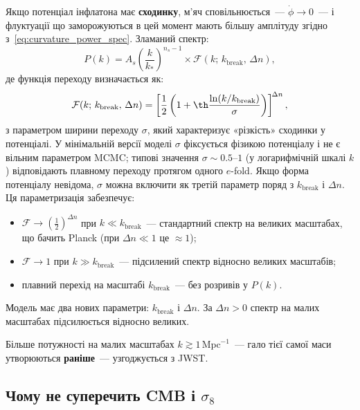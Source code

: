\documentclass[12pt, a4paper]{article}
\begin{document}
Якщо потенціал інфлатона має \textbf{сходинку}, м'яч сповільнюється~---
$\dot{\phi} \to 0$~--- і флуктуації що заморожуються в цей момент
мають більшу амплітуду згідно з~\eqref{eq:curvature_power_spec}.
Зламаний спектр:
\begin{equation}\label{eq:broken_spectrum}
  P(k) = A_s \left(\frac{k}{k_*}\right)^{n_s-1}
  \times \mathcal{F}(k;\, k_\mathrm{break},\, \Delta n),
\end{equation}
де функція переходу визначається як:
\begin{equation}\label{eq:F_def}
  \mathcal{F}(k;\, k_\mathrm{break},\, \Delta n)
  = \left[\frac{1}{2}\left(1 + \th\frac{\ln(k/k_\mathrm{break})}
    {\sigma}\right)\right]^{\!\Delta n},
\end{equation}
з параметром ширини переходу $\sigma$, який характеризує
«різкість» сходинки у потенціалі. У мінімальній версії моделі
$\sigma$ фіксується фізикою потенціалу і не є вільним
параметром MCMC; типові значення $\sigma \sim 0.5$--$1$
(у логарифмічній шкалі $k$) відповідають плавному переходу
протягом одного $e$-fold. Якщо форма потенціалу невідома,
$\sigma$ можна включити як третій параметр поряд з
$k_\mathrm{break}$ і $\Delta n$. Ця параметризація забезпечує:
\begin{itemize}
  \item $\mathcal{F} \to \left(\tfrac{1}{2}\right)^{\Delta n}$
        при $k \ll k_\mathrm{break}$~---
        стандартний спектр на великих масштабах, що бачить Planck
        (при $\Delta n \ll 1$ це $\approx 1$);
  \item $\mathcal{F} \to 1$ при $k \gg k_\mathrm{break}$~---
        підсилений спектр відносно великих масштабів;
  \item плавний перехід на масштабі $k_\mathrm{break}$~---
        без розривів у $P(k)$.
\end{itemize}
Модель має два нових параметри: $k_\mathrm{break}$ і $\Delta n$.
За $\Delta n > 0$ спектр на малих масштабах підсилюється відносно великих.

Більше потужності на малих масштабах $k \gtrsim 1\,\mathrm{Mpc}^{-1}$~---
гало тієї самої маси утворюються \textbf{раніше}~--- узгоджується з JWST.

\subsection{Чому не суперечить CMB і $\sigma_8$}
\end{document}
